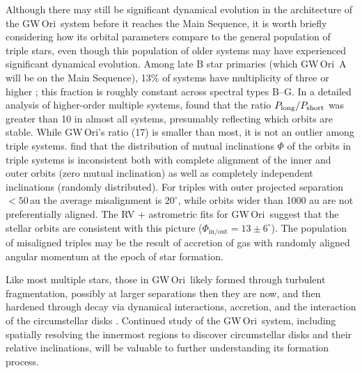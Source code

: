 \documentclass[twocolumn]{aastex61}
\newcommand{\obj}{GW\,Ori}
\begin{document}
Although there may still be significant dynamical evolution in the architecture of the \obj\ system before it reaches the Main Sequence, it is worth briefly considering how its orbital parameters compare to the general population of triple stars, even though this population of older systems may have experienced significant dynamical evolution. Among late B star primaries (which \obj~A will be on the Main Sequence), 13\% of systems have multiplicity of three or higher \citep{eggleton08}; this fraction is roughly constant across spectral types B--G. In a detailed analysis of higher-order multiple systems, \citet{tokovinin97} found that the ratio $P_\mathrm{long} / P_{\rm short}$ was greater than 10 in almost all systems, presumably reflecting which orbits are stable. While \obj's ratio (17) is smaller than most, it is not an outlier among triple systems.
\citet{tokovinin97,tokovinin17} find that the distribution of mutual inclinations $\Phi$ of the orbits in triple systems is inconsistent both with complete alignment of the inner and outer orbits (zero mutual inclination) as well as completely independent inclinations (randomly distributed).
For triples with outer projected separation $< 50\,$au the average misalignment is $20^\circ$, while orbits wider than 1000 au are not preferentially aligned.
The RV + astrometric fits for \obj\ suggest that the stellar orbits are consistent with this picture ($\Phi_\mathrm{in/out} = 13 \pm 6^\circ$).
The population of misaligned triples may be the result of accretion of gas with randomly aligned angular momentum at the epoch of star formation.

Like most multiple stars, those in \obj\ likely formed through turbulent fragmentation, possibly at larger separations then they are now, and then hardened through decay via dynamical interactions, accretion, and the interaction of the circumstellar disks \citep{offner10,bate12}. Continued study of the \obj\ system, including spatially resolving the innermost regions to discover circumstellar disks and their relative inclinations, will be valuable to further understanding its formation process.

\end{document}
